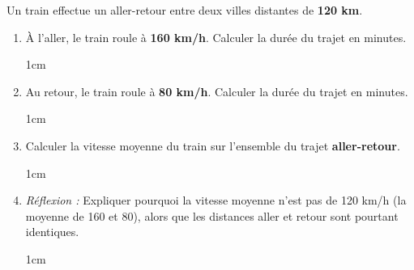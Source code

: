 \documentclass[a4paper]{book}
\begin{document}
    \begin{exercice}
        Un train effectue un aller-retour entre deux villes distantes de \textbf{120 km}.
        \begin{enumerate}
            \item À l'aller, le train roule à \textbf{160 km/h}. Calculer la durée du trajet en minutes.
            \begin{ZoneReponse}{1cm}    
            \end{ZoneReponse}
            
            \item Au retour, le train roule à \textbf{80 km/h}. Calculer la durée du trajet en minutes.
            \begin{ZoneReponse}{1cm}    
            \end{ZoneReponse}
            
            \item Calculer la vitesse moyenne du train sur l'ensemble du trajet \textbf{aller-retour}.
            \begin{ZoneReponse}{1cm}    
            \end{ZoneReponse}
            
            \item \textit{Réflexion :} Expliquer pourquoi la vitesse moyenne n'est pas de 120 km/h (la moyenne de 160 et 80), alors que les distances aller et retour sont pourtant identiques.
            \begin{ZoneReponse}{1cm}    
            \end{ZoneReponse}
        \end{enumerate}
    \end{exercice}
        

        
\end{document}
